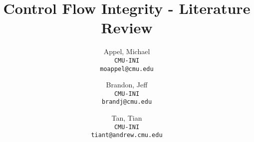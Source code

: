 \documentclass[letterpaper,10pt]{article}
\begin{document}
\title{Control Flow Integrity - Literature Review}
\author{
  Appel, Michael\\
  \texttt{CMU-INI} \\
  \texttt{moappel@cmu.edu}
  \and
  Brandon, Jeff\\
  \texttt{CMU-INI} \\
  \texttt{brandj@cmu.edu} 
  \and
  Tan, Tian \\
  \texttt{CMU-INI} \\
  \texttt{tiant@andrew.cmu.edu}
}
\maketitle



\end{document}
